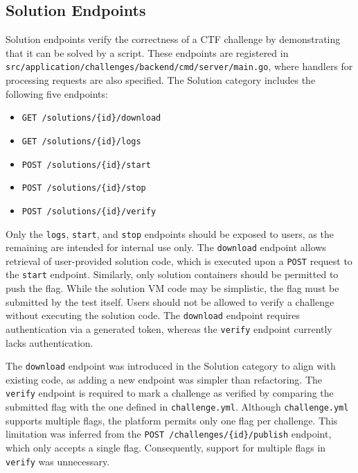 \subsection{Solution Endpoints}
Solution endpoints verify the correctness of a CTF challenge by demonstrating that it can be solved by a script. These endpoints are registered in \texttt{src/application/challenges/backend/cmd/server/main.go}, where handlers for processing requests are also specified. The Solution category includes the following five endpoints:

\begin{itemize}
    \item \texttt{GET /solutions/\{id\}/download}
    \item \texttt{GET /solutions/\{id\}/logs}
    \item \texttt{POST /solutions/\{id\}/start}
    \item \texttt{POST /solutions/\{id\}/stop}
    \item \texttt{POST /solutions/\{id\}/verify}
\end{itemize}

Only the \texttt{logs}, \texttt{start}, and \texttt{stop} endpoints should be exposed to users, as the remaining are intended for internal use only. The \texttt{download} endpoint allows retrieval of user-provided solution code, which is executed upon a \texttt{POST} request to the \texttt{start} endpoint. Similarly, only solution containers should be permitted to push the flag. While the solution VM code may be simplistic, the flag must be submitted by the test itself. Users should not be allowed to verify a challenge without executing the solution code. The \texttt{download} endpoint requires authentication via a generated token, whereas the \texttt{verify} endpoint currently lacks authentication.

The \texttt{download} endpoint was introduced in the Solution category to align with existing code, as adding a new endpoint was simpler than refactoring. The \texttt{verify} endpoint is required to mark a challenge as verified by comparing the submitted flag with the one defined in \texttt{challenge.yml}. Although \texttt{challenge.yml} supports multiple flags, the platform permits only one flag per challenge. This limitation was inferred from the \texttt{POST /challenges/\{id\}/publish} endpoint, which only accepts a single flag. Consequently, support for multiple flags in \texttt{verify} was unnecessary.

